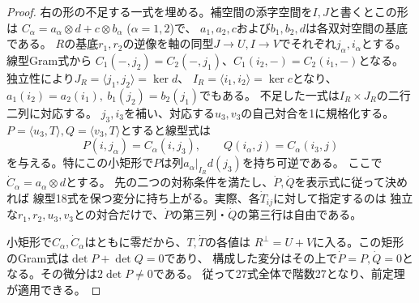 \begin{proof}
右の形の不足する一式を埋める。補空間の添字空間を$I,J$と書くとこの形は
$C_\alpha=a_\alpha\otimes d+c\otimes b_\alpha$ ($\alpha=1,2$)で、
$a_1,a_2,c$および$b_1,b_2,d$は各双対空間の基底である。
$R$の基底$r_1,r_2$の逆像を軸の同型$J\to U,I\to V$でそれぞれ$j_\alpha,i_\alpha$とする。
線型Gram式から
$C_1(-,j_2)=C_2(-,j_1)$、$C_1(i_2,-)=C_2(i_1,-)$となる。
独立性により$J_R=\langle j_1,j_2\rangle=\ker d$、
$I_R=\langle i_1,i_2\rangle=\ker c$となり、
$a_1(i_2)=a_2(i_1),\ b_1(j_2)=b_2(j_1)$でもある。
不足した一式は$I_R\times J_R$の二行二列に対応する。
$j_3,i_3$を補い、対応する$u_3,v_3$の自己対合を1に規格化する。
$P=\langle u_3,T\rangle, Q=\langle v_3,T\rangle$とすると線型式は
\[
 P(i,j_\alpha)=C_\alpha(i,j_3),\qquad Q(i_\alpha,j)=C_\alpha(i_3,j)
\]
を与える。特にこの小矩形で$P$は列$a_\alpha|_{I_R}d(j_3)$を持ち可逆である。
ここで$\dot C_\alpha=a_\alpha\otimes d$とする。
先の二つの対称条件を満たし、$\dot P,\dot Q$を表示式に従って決めれば
線型18式を保つ変分に持ち上がる。実際、各$\dot T_{ij}$に対して指定するのは
独立な$r_1,r_2,u_3,v_3$との対合だけで、$\dot P$の第三列・$\dot Q$の第三行は自由である。

小矩形で$C_\alpha,\dot C_\alpha$はともに零だから、$T,\dot T$の各値は
$R^\perp=U+V$に入る。この矩形のGram式は$\det P+\det Q=0$であり、
構成した変分はその上で$\dot P=P,\dot Q=0$となる。その微分は$2\det P\ne0$である。
従って27式全体で階数27となり、前定理が適用できる。
\end{proof}

